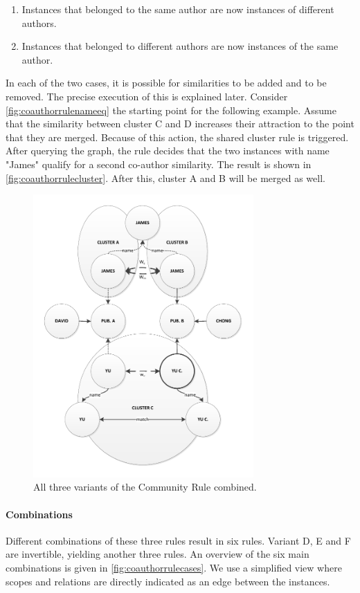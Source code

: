 \begin{enumerate}
\item Instances that belonged to the same author are now instances of different authors.
\item Instances that belonged to different authors are now instances of the same author.
\end{enumerate}

In each of the two cases, it is possible for similarities to be added and to be removed. The precise execution of this is explained later. Consider \autoref{fig:coauthorrulenameeq} the starting point for the following example. Assume that the similarity between cluster C and D increases their attraction to the point that they are merged. Because of this action, the shared cluster rule is triggered. After querying the graph, the rule decides that the two instances with name "James" qualify for a second co-author similarity. The result is shown in \autoref{fig:coauthorrulecluster}. After this, cluster A and B will be merged as well.

\begin{figure}[htb]
	\centering
		\includegraphics[width=0.75\textwidth]{fig/coauthorrulecluster}
	\caption{All three variants of the Community Rule combined.}
	\label{fig:coauthorrulecluster}
\end{figure}

\paragraph{Combinations} Different combinations of these three rules result in six rules. Variant D, E and F are invertible, yielding another three rules. An overview of the six main combinations is given in \autoref{fig:coauthorrulecases}. We use a simplified view where scopes and relations are directly indicated as an edge between the instances.

